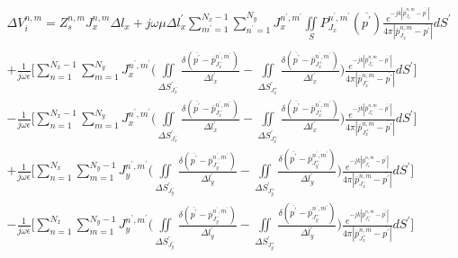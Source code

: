 \documentclass[
	12pt,				%
	openright,			%
	oneside,			%
	a4papey79r,			%
	english,			%
	brazil				%
	]{abntex2}
\begin{document}
\begin{equation}\label{DVnmPotencialScalarPulse2Delta}
\begin{aligned}
      \Delta V_i^{n,m}=Z_s^{n,m}  J_{x}^{n,m} {\Delta l}_x
      +
    j\omega \mu   {\Delta l}^{{'}}_x \sum_{m^{'}=1}^{N_x-1}\sum_{n^{'}=1}^{N_y} J_{x}^{n^{'},m^{'}} \iint\limits_{S}  P_{J_x}^{n^{'},m^{'}}(\overline{p^{'}})   \frac{e^{-j k |\overline{p}_{{J_x}}^{n,m}-\overline{p^{'}}|}}{4 \pi |\overline{p}_{{J_x}}^{n,m}-\overline{p^{'}}|} dS^{'}    \\ \\
    +
    \frac{1}{j\omega \epsilon}\biggl[ \sum_{n=1}^{N_x-1}\sum_{m=1}^{N_y}J_{x}^{n^{'},m^{'}} 
\biggl(\iint \limits_{{\Delta S}^{'}_{J_x^-}}  \frac{ \delta(\overline{p^{'}}-\overline{p}^{n^{'},m^{'}}_{J_x^{-}})}{\Delta l^{'}_x } 
- \iint \limits_{{\Delta S}^{'}_{J_x^{+}}}  \frac{ \delta(\overline{p^{'}}-\overline{p}^{n^{'},m^{'}}_{J_x^{+}})}{\Delta l^{'}_x } 
\biggl)
\frac{e^{-j k |\overline{p}_{{J_x^{-}}}^{n,m}-\overline{p^{'}}|}}{4 \pi |\overline{p}_{{J_x^{-}}}^{n,m}-\overline{p^{'}}|} dS^{'}  \biggl] \\
    -
      \frac{1}{j\omega \epsilon}\biggl[ \sum_{n=1}^{N_x-1}\sum_{m=1}^{N_y}J_{x}^{n^{'},m^{'}} 
\biggl(\iint \limits_{{\Delta S}^{'}_{J_x^-}}  \frac{ \delta(\overline{p^{'}}-\overline{p}^{n^{'},m^{'}}_{J_x^{-}})}{\Delta l^{'}_x } 
- \iint \limits_{{\Delta S}^{'}_{J_x^{+}}}  \frac{ \delta(\overline{p^{'}}-\overline{p}^{n^{'},m^{'}}_{J_x^{+}})}{\Delta l^{'}_x } 
\biggl)
\frac{e^{-j k |\overline{p}_{{J_x^{+}}}^{n,m}-\overline{p^{'}}|}}{4 \pi |\overline{p}_{{J_x^{+}}}^{n,m}-\overline{p^{'}}|}dS^{'}  \biggl] \\
    +
    \frac{1}{j\omega \epsilon}\biggl[ \sum_{n=1}^{N_x}\sum_{m=1}^{N_y-1}J_{y}^{n^{'},m^{'}} 
\biggl(\iint \limits_{{\Delta S}^{'}_{J_y^-}}  \frac{ \delta(\overline{p^{'}}-\overline{p}^{n^{'},m^{'}}_{J_y^{-}})}{\Delta l^{'}_y } 
- \iint \limits_{{\Delta S}^{'}_{J_y^{+}}}  \frac{ \delta(\overline{p^{'}}-\overline{p}^{n^{'},m^{'}}_{J_y^{+}})}{\Delta l^{'}_y } 
\biggl)
\frac{e^{-j k |\overline{p}_{{J_x^{-}}}^{n,m}-\overline{p^{'}}|}}{4 \pi |\overline{p}_{{J_x^{-}}}^{n,m}-\overline{p^{'}}|} dS^{'}  \biggl] \\
    -
      \frac{1}{j\omega \epsilon}\biggl[ \sum_{n=1}^{N_x}\sum_{m=1}^{N_y-1}J_{y}^{n^{'},m^{'}} 
\biggl(\iint \limits_{{\Delta S}^{'}_{J_y^-}}  \frac{ \delta(\overline{p^{'}}-\overline{p}^{n^{'},m^{'}}_{J_y^{-}})}{\Delta l^{'}_y } 
- \iint \limits_{{\Delta S}^{'}_{J_y^{+}}}  \frac{ \delta(\overline{p^{'}}-\overline{p}^{n^{'},m^{'}}_{J_y^{+}})}{\Delta l^{'}_y } 
\biggl)\frac{e^{-j k |\overline{p}_{{J_x^{+}}}^{n,m}-\overline{p^{'}}|}}{4 \pi |\overline{p}_{{J_x^{+}}}^{n,m}-\overline{p^{'}}|}dS^{'}  \biggl] \\
\end{aligned}
\end{equation}
\end{document}
